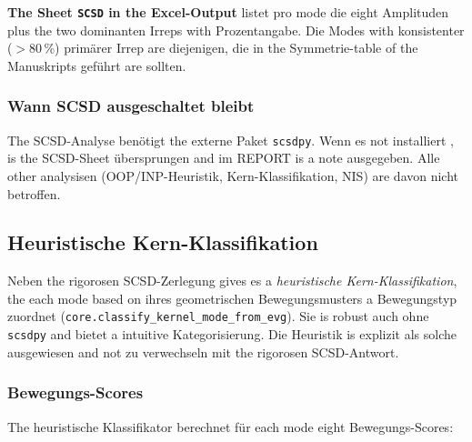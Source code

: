 \documentclass[11pt,a4paper,twoside]{article}
\theoremstyle{remark}
\begin{document}
\begin{infobox}
\textbf{The Sheet \texttt{SCSD} in the Excel-Output} listet pro mode die
eight Amplituden plus the two dominanten Irreps with Prozentangabe. Die
Modes with konsistenter ($>$80\,\%) prim\"arer Irrep are diejenigen,
die in the Symmetrie-table of the Manuskripts gef\"uhrt are sollten.
\end{infobox}

\subsubsection*{Wann SCSD ausgeschaltet bleibt}

The SCSD-Analyse ben\"otigt the externe Paket \texttt{scsdpy}. Wenn
es not installiert , is the SCSD-Sheet \"ubersprungen and im
REPORT is a note ausgegeben. Alle other analysisen
(OOP/INP-Heuristik, Kern-Klassifikation, NIS) are davon nicht
betroffen.

\subsection{Heuristische Kern-Klassifikation}
\label{sec:kern-klassifikation}

Neben the rigorosen SCSD-Zerlegung gives es a \emph{heuristische
Kern-Klassifikation}, the each mode based on ihres geometrischen
Bewegungsmusters a Bewegungstyp zuordnet
(\texttt{core.classify\_kernel\_mode\_from\_evg}). Sie is robust auch
ohne \texttt{scsdpy} and bietet a intuitive Kategorisierung. Die
Heuristik is explizit als solche ausgewiesen and not zu verwechseln
mit the rigorosen SCSD-Antwort.

\subsubsection*{Bewegungs-Scores}

The heuristische Klassifikator berechnet f\"ur each mode eight
Bewegungs-Scores:
\end{document}
